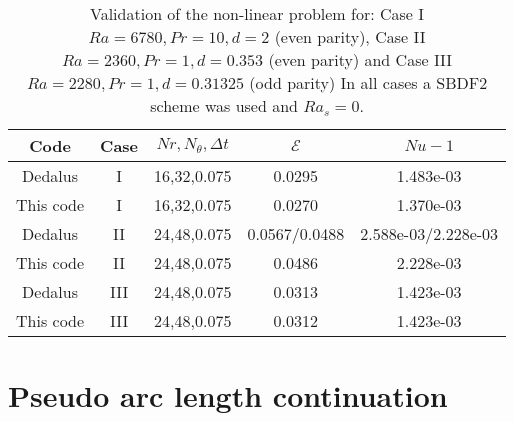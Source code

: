 \documentclass[a4paper]{article}
\newcommand{\Pran}{Pr}
\begin{document}
\begin{table}[h!]
    \centering
    \begin{tabular}{ c | c | c|  c | c  }
        \hline
        Code &  Case  & $Nr, N_{\theta}, \Delta t$ & $\mathcal{E}$ & $Nu - 1$  \\
        \hline
        Dedalus   & I & 16,32,0.075 & 0.0295 & 1.483e-03 \\
        This code & I & 16,32,0.075 & 0.0270 & 1.370e-03 \\
        Dedalus   & II &24,48,0.075 & 0.0567/0.0488 & 2.588e-03/2.228e-03 \\
        This code & II &24,48,0.075 & 0.0486 & 2.228e-03 \\
        Dedalus   & III &24,48,0.075 & 0.0313 & 1.423e-03 \\
        This code & III &24,48,0.075 & 0.0312 & 1.423e-03 \\ %
        \hline
    \end{tabular}
    \caption{Validation of the non-linear problem for: Case I $Ra =6780,\Pran=10,d=2$ (even parity), Case II $Ra = 2360,\Pran=1,d=0.353$ (even parity) and Case III $Ra = 2280,\Pran=1,d=0.31325$ (odd parity) In all cases a SBDF2 scheme was used and $Ra_s=0$.}
    \label{table:Non_Linear_Validation}
\end{table}

\newpage



\section{Pseudo arc length continuation}
\end{document}
